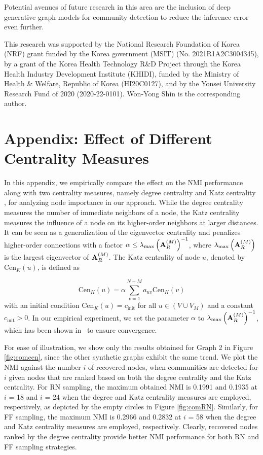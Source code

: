 \documentclass[format=acmsmall, review=false, screen=true]{acmart}
\begin{document}
Potential avenues of future research in this area are the inclusion of deep generative graph models for community detection to reduce the inference error even further.

\begin{acks}
This research was supported by the National Research Foundation of Korea (NRF) grant funded by the Korea government (MSIT) (No. 2021R1A2C3004345), by a grant of the Korea Health Technology R\&D Project through the Korea Health Industry Development Institute (KHIDI), funded by the Ministry of Health \& Welfare, Republic of Korea (HI20C0127), and by the Yonsei University Research Fund of 2020 (2020-22-0101). Won-Yong Shin is the corresponding author.
\end{acks}

\section*{Appendix: Effect of Different Centrality Measures}\label{sec:appx}

In this appendix, we empirically compare the effect on the NMI performance along with two centrality measures, namely degree centrality and Katz centrality \cite{katz}, for
analyzing node importance in our approach. While the degree centrality measures the number of immediate neighbors of a node, the Katz centrality measures the influence of a node on its higher-order neighbors at larger distances. It can be seen as a generalization of the eigenvector centrality and penalizes higher-order connections with a factor $\alpha \leq \lambda_{\max}\left({\bf A}_R^{(M)}\right)^{-1}$, where $\lambda_{\max}\left({\bf A}_R^{(M)}\right)$ is the largest eigenvector of ${\bf A}_R^{(M)}$. The Katz centrality of node $u$, denoted by $\text{Cen}_K(u)$, is defined as

\begin{equation}\label{eq:katzcen}
\nonumber
\text{Cen}_{K}(u)=\alpha\sum _{v=1}^{N+M}a_{uv}\text{Cen}_{K}(v)
\end{equation} 
with an initial condition $\text{Cen}_K(u)={c}_\text{init}$ for all $u\in (V \cup V_M)$ and a constant ${c}_\text{init}>0$.
In our empirical experiment, we set the parameter $\alpha$ to $\lambda_{\max}\left({\bf A}^{(M)}_R\right)^{-1}$, which has been shown in~\cite{katzparam} to ensure convergence.

For ease of illustration, we show only the results obtained for Graph 2 in Figure \ref{fig:comcen}, since the other synthetic graphs exhibit the same trend. We plot the NMI against the number $i$ of recovered nodes, when communities are detected for $i$ given nodes that are ranked based on both the degree centrality and the Katz centrality. For RN sampling, the maximum obtained NMI is 0.1991 and 0.1935 at $i$ = 18 and $i$ = 24 when the degree and Katz centrality measures are employed, respectively, as depicted by the empty circles in Figure \ref{fig:comRN}. Similarly, for FF sampling, the maximum NMI is 0.2966 and 0.2832 at $i$ = 58 when the degree and Katz centrality measures are employed, respectively. Clearly, recovered nodes ranked by the degree centrality provide better NMI performance for both RN and FF sampling strategies.
\end{document}

